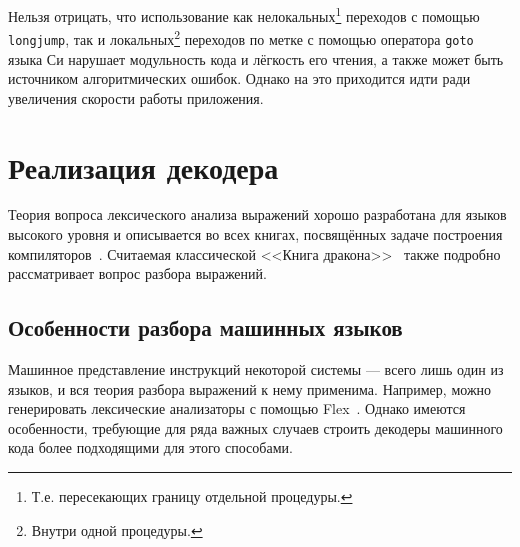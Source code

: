 Нельзя отрицать, что использование как нелокальных\footnote{Т.е. пересекающих границу отдельной процедуры.} переходов с помощью \texttt{longjump}, так и локальных\footnote{Внутри одной процедуры.} переходов по метке с помощью оператора \texttt{goto} языка Си нарушает модульность кода и лёгкость его чтения, а также может быть источником алгоритмических ошибок. Однако на это приходится идти ради увеличения скорости работы приложения.

\section{Реализация декодера}\label{sec:decoding}

Теория вопроса лексического анализа выражений хорошо разработана для языков высокого уровня и описывается во всех книгах, посвящённых задаче построения компиляторов~\cite{eac2011}. Считаемая классической <<Книга дракона>>~\cite{dragonbook} также подробно рассматривает вопрос разбора выражений.

\subsection{Особенности разбора машинных языков}

Машинное представление инструкций некоторой системы --- всего лишь один из языков, и вся теория разбора выражений к нему применима. Например, можно генерировать лексические анализаторы с помощью Flex~\cite{flex-manual}. Однако имеются особенности, требующие для ряда важных случаев строить декодеры машинного кода более подходящими для этого способами.

